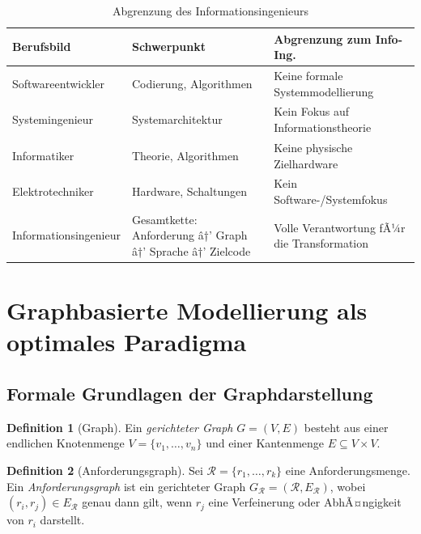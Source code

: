 ﻿\documentclass[a4paper,12pt]{article}
\theoremstyle{definition}
\newtheorem{definition}{Definition}
\begin{document}
\begin{table}[h]
\centering
\caption{Abgrenzung des Informationsingenieurs}
\begin{tabular}{@{}lp{4.5cm}p{4.5cm}@{}}
\toprule
\textbf{Berufsbild} & \textbf{Schwerpunkt} & \textbf{Abgrenzung zum Info-Ing.} \\
\midrule
Softwareentwickler & Codierung, Algorithmen & Keine formale Systemmodellierung \\
Systemingenieur    & Systemarchitektur      & Kein Fokus auf Informationstheorie \\
Informatiker       & Theorie, Algorithmen   & Keine physische Zielhardware \\
Elektrotechniker   & Hardware, Schaltungen  & Kein Software-/Systemfokus \\
Informationsingenieur & Gesamtkette: Anforderung â†’ Graph â†’ Sprache â†’ Zielcode & Volle Verantwortung fÃ¼r die Transformation \\
\bottomrule
\end{tabular}
\end{table}

\section{Graphbasierte Modellierung als optimales Paradigma}
\label{sec:graphmodell}

\subsection{Formale Grundlagen der Graphdarstellung}

\begin{definition}[Graph]
Ein \emph{gerichteter Graph} $G = (V, E)$ besteht aus einer endlichen Knotenmenge
$V = \{v_1, \ldots, v_n\}$ und einer Kantenmenge
$E \subseteq V \times V$.
\end{definition}

\begin{definition}[Anforderungsgraph]
\label{def:anfgraph}
Sei $\mathcal{R} = \{r_1, \ldots, r_k\}$ eine Anforderungsmenge. Ein
\emph{Anforderungsgraph} ist ein gerichteter Graph
$G_{\mathcal{R}} = (\mathcal{R}, E_{\mathcal{R}})$, wobei
$(r_i, r_j) \in E_{\mathcal{R}}$ genau dann gilt, wenn $r_j$ eine Verfeinerung oder
AbhÃ¤ngigkeit von $r_i$ darstellt.
\end{definition}
\end{document}
